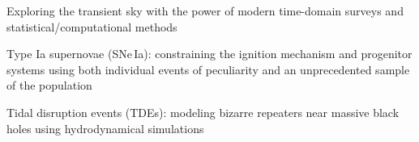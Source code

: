 


\begin{cvpubs}


\cvpub
{ %
\begin{cvitems}
\item Exploring the transient sky with the power of modern time-domain surveys and statistical/computational methods
\item Type Ia supernovae (SNe\,Ia): constraining the ignition mechanism and progenitor systems using both individual events of peculiarity and an unprecedented sample of the population
\item Tidal disruption events (TDEs): modeling bizarre repeaters near massive black holes using hydrodynamical simulations
\end{cvitems}
}


\end{cvpubs}